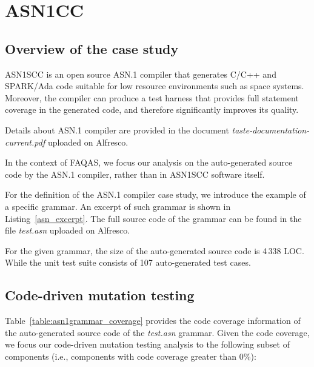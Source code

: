 
\section{ASN1CC}
\label{sec:caseStudies:GSL:ASN1}

\subsection{Overview of the case study}

ASN1SCC is an open source ASN.1 compiler that generates C/C++ and SPARK/Ada code suitable for low resource environments such as space systems. Moreover, the compiler can produce a test harness that provides full statement coverage in the generated code, and therefore significantly improves its quality.

Details about ASN.1 compiler are provided in the document \emph{taste-documentation-current.pdf} uploaded on Alfresco.

In the context of FAQAS, we focus our analysis on the auto-generated source code by the ASN.1 compiler, rather than in ASN1SCC software itself.

For the definition of the ASN.1 compiler case study, we introduce the example of a specific grammar. An excerpt of such grammar is shown in Listing~\ref{asn_excerpt}. The full source code of the grammar can be found in the file \emph{test.asn} uploaded on Alfresco.

For the given grammar, the size of the auto-generated source code is 4\,338 LOC. While the unit test suite consists of 107 auto-generated test cases.



\subsection{Code-driven mutation testing}




Table~\ref{table:asn1grammar_coverage} provides the code coverage information of the auto-generated source code of the \emph{test.asn} grammar. Given the code coverage, we focus our code-driven mutation testing analysis to the following subset of components (i.e., components with code coverage greater than 0\%):

